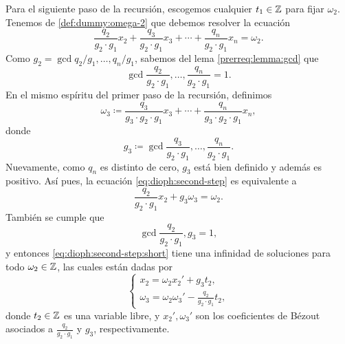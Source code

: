 Para el siguiente paso de la recursión, escogemos cualquier $t_1 \in \mathbb{Z}$ para fijar $\omega_2$.
Tenemos de \eqref{def:dummy:omega-2} que debemos resolver la ecuación
\begin{equation}
	\label{eq:dioph:second-step}
	\frac{q_2}{g_2 \cdot g_1}x_2 +
	\frac{q_3}{g_2 \cdot g_1}x_3 +
	\cdots +
	\frac{q_n}{g_2 \cdot g_1}x_n
	= \omega_2.
\end{equation}
Como $g_2 = \gcd{q_2/g_1, \ldots, q_n/g_1}$, sabemos del lema \ref{prerreq:lemma:gcd}
que
\begin{equation*}
	\gcd{\frac{q_2}{g_2 \cdot g_1}, \ldots, \frac{q_n}{g_2 \cdot g_1}} = 1.
\end{equation*}
En el mismo espíritu del primer paso de la recursión, definimos
\begin{equation*}
	\omega_3 \coloneq \frac{q_3}{g_3 \cdot g_2 \cdot g_1}x_3 + \cdots + \frac{q_n}{g_3
	\cdot g_2 \cdot g_1}x_n,
\end{equation*}
donde
\begin{equation*}
	g_3 \coloneq  \gcd{\frac{q_3}{g_2 \cdot g_1}, \ldots, \frac{q_n}{g_2 \cdot g_1}}.
\end{equation*}
Nuevamente, como $q_n$ es distinto de cero, $g_3$ está bien definido y además es positivo. Así pues,
la ecuación \eqref{eq:dioph:second-step} es equivalente a
\begin{equation}
	\label{eq:dioph:second-step:short}
	\frac{q_2}{g_2 \cdot g_1}x_2 + g_3\omega_3 = \omega_2.
\end{equation}
También se cumple que
\begin{equation*}
	\gcd{\frac{q_2}{g_2 \cdot g_1}, g_3} = 1,
\end{equation*}
y entonces \eqref{eq:dioph:second-step:short} tiene una infinidad de soluciones para todo $\omega_2 \in
\mathbb{Z}$, las cuales están dadas por
\begin{equation*}
	\begin{cases}
		x_2 = \omega_2x_2' + g_3t_2, \\
		\omega_3 = \omega_2\omega_3' - \frac{q_2}{g_2 \cdot g_1}t_2,
	\end{cases}
\end{equation*}
donde $t_2 \in \mathbb{Z}$ es una variable libre, y $x_2', \omega_3'$ son los coeficientes de Bézout
asociados a $\frac{q_2}{g_2 \cdot g_1}$ y $g_3$, respectivamente.

